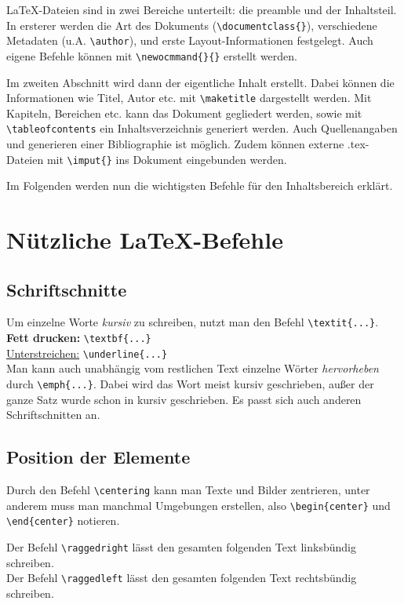 \documentclass[ngerman]{scrreport}
\begin{document}
\LaTeX-Dateien sind in zwei Bereiche unterteilt: die preamble und der Inhaltsteil. In ersterer werden die Art des Dokuments (\verb|\documentclass{}|), verschiedene Metadaten (u.A. \verb|\author|), und erste Layout-Informationen festgelegt.
Auch eigene Befehle können mit \verb|\newocmmand{}{}| erstellt werden.

Im zweiten Abschnitt wird dann der eigentliche Inhalt erstellt. Dabei können die Informationen wie Titel, Autor etc. mit \verb|\maketitle| dargestellt werden. Mit Kapiteln, Bereichen etc. kann das Dokument gegliedert werden, sowie mit \verb|\tableofcontents| ein Inhaltsverzeichnis generiert werden.
Auch Quellenangaben und generieren einer Bibliographie ist möglich. Zudem können externe .tex-Dateien mit \verb|\imput{}| ins Dokument eingebunden werden. 

Im Folgenden werden nun die wichtigsten Befehle für den Inhaltsbereich erklärt.

\chapter{\centering Nützliche \LaTeX{}-Befehle}

\section{Schriftschnitte}
Um einzelne Worte \textit{kursiv} zu schreiben, nutzt man den Befehl {\color{blue}\verb|\textit{...}|}.\\
\textbf{Fett drucken:} {\color{blue}\verb|\textbf{...}|}\\
\underline{Unterstreichen:} {\color{blue}\verb|\underline{...}|}\\
Man kann auch unabhängig vom restlichen Text einzelne Wörter \emph{hervorheben} durch {\color{blue}\verb|\emph{...}|}. Dabei wird das Wort meist kursiv geschrieben, außer der ganze Satz wurde schon in kursiv geschrieben. Es passt sich auch anderen Schriftschnitten an.


\section{Position der Elemente}
Durch den Befehl {\color{blue}\verb|\centering|} kann man Texte und Bilder zentrieren, unter anderem muss man manchmal Umgebungen erstellen, also {\color{blue}\verb|\begin{center}|} und {\color{blue}\verb|\end{center}|} notieren.\\
\raggedright Der Befehl {\color{blue}\verb|\raggedright|} lässt den gesamten folgenden Text linksbündig schreiben.\\
\raggedleft Der Befehl {\color{blue}\verb|\raggedleft|} lässt den gesamten folgenden Text rechtsbündig schreiben.
\raggedright
\end{document}
